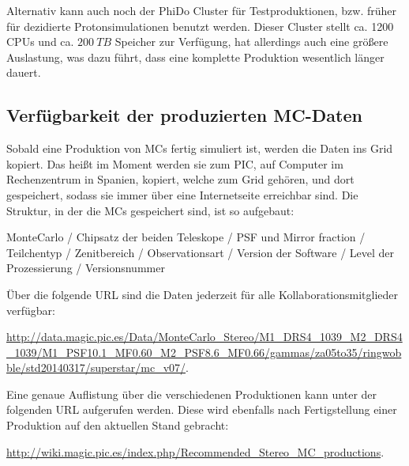 Alternativ kann auch noch der PhiDo Cluster für Testproduktionen, bzw. früher für dezidierte Protonsimulationen benutzt werden. 
Dieser Cluster stellt ca. 1200 CPUs und ca. $\SI{200}{TB}$ Speicher zur Verfügung, hat allerdings auch eine größere Auslastung, was dazu führt, dass eine komplette Produktion wesentlich länger dauert.



\subsection{Verfügbarkeit der produzierten MC-Daten}
\label{sec:Wenn die MCs fertig sind}
Sobald eine Produktion von MCs fertig simuliert ist, werden die Daten ins Grid kopiert.
Das heißt im Moment werden sie zum PIC, auf Computer im Rechenzentrum in Spanien, kopiert, welche zum Grid gehören, und dort gespeichert, sodass sie immer über eine Internetseite erreichbar sind.
Die Struktur, in der die MCs gespeichert sind, ist so aufgebaut:\newline 

MonteCarlo / Chipsatz der beiden Teleskope / PSF und Mirror fraction / Teilchentyp / Zenitbereich / Observationsart / Version der Software / Level der Prozessierung / Versionsnummer \newline

Über die folgende URL sind die Daten jederzeit für alle Kollaborationsmitglieder verfügbar:

\url{http://data.magic.pic.es/Data/MonteCarlo_Stereo/M1_DRS4_1039_M2_DRS4_1039/M1_PSF10.1_MF0.60_M2_PSF8.6_MF0.66/gammas/za05to35/ringwobble/std20140317/superstar/mc_v07/}.

Eine genaue Auflistung über die verschiedenen Produktionen kann unter der folgenden URL aufgerufen werden.
Diese wird ebenfalls nach Fertigstellung einer Produktion auf den aktuellen Stand gebracht:

\url{http://wiki.magic.pic.es/index.php/Recommended_Stereo_MC_productions}.


